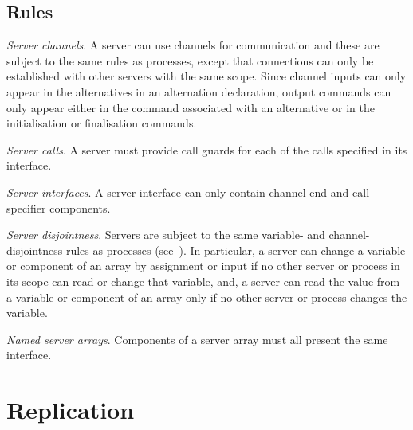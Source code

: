 \documentclass[11pt,a4paper,parskip=half-]{scrartcl}
\begin{document}
\subsection{Rules}

\ben[resume]

\item \emph{Server channels}. A server can use channels for communication and
  these are subject to the same rules as processes, except that connections can
  only be established with other servers with the same scope.
  Since channel inputs can only appear in the alternatives in an alternation
  declaration, output commands can only appear either in the command associated
  with an alternative or in the initialisation or finalisation commands.

\item \emph{Server calls}. A server must provide call guards for each of the
  calls specified in its interface.

\item \emph{Server interfaces}. A server interface can only contain channel
  end and call specifier components.

\item \emph{Server disjointness}. Servers are subject to the same variable- and
  channel-disjointness rules as processes (see~).
  In particular, a server can change a variable or component of an array by
  assignment or input if no other server or process in its scope can read or
  change that variable, and, a server can read the value from a variable or
  component of an array only if no other server or process changes the
  variable.

\item \emph{Named server arrays}. Components of a server array must all present
  the same interface.

\een



\clearpage
\section{Replication}
\label{sec:replication}
\end{document}
